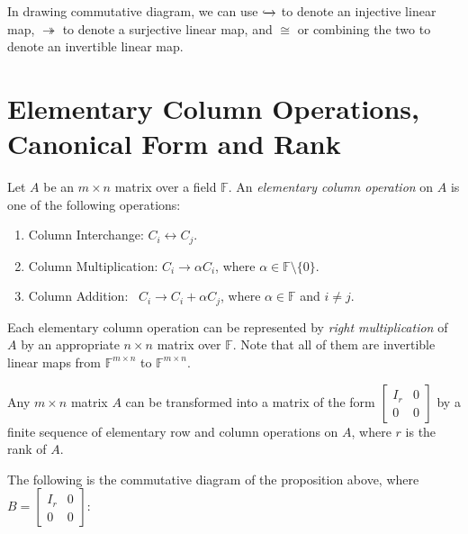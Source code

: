 \documentclass[
	11pt, %
	fleqn, %
	a4paper, %
]{LegrandOrangeBook}
\newcommand{\F}{\mathbb{F}} %
\begin{document}
\begin{remark}
    In drawing commutative diagram, we can use $\xhookrightarrow{}$ to denote an injective linear map, $\twoheadrightarrow$ to denote a surjective linear map, and $\cong$ or combining the two to denote an invertible linear map.
\end{remark}

\newpage

\section{Elementary Column Operations, Canonical Form and Rank}

\begin{definition}
    Let $A$ be an $m \times n$ matrix over a field $\F$. An \emph{elementary column operation} on $A$ is one of the following operations:
    \begin{enumerate}
        \item Column Interchange: \qquad $C_i \leftrightarrow C_j$.
        \item Column Multiplication: \quad $C_i \to \alpha C_i$, where $\alpha \in \F \setminus \{0\}$.
        \item Column Addition: \qquad\quad\ $C_i \to C_i + \alpha C_j$, where $\alpha \in \F$ and $i \neq j$.
    \end{enumerate}
    Each elementary column operation can be represented by \emph{right multiplication} of $A$ by an appropriate $n \times n$ matrix over $\F$. Note that all of them are invertible linear maps from $\F^{m \times n}$ to $\F^{m \times n}$.
\end{definition}

\begin{proposition}
    Any $m \times n$ matrix $A$ can be transformed into a matrix of the form $\begin{bmatrix}
        I_r & 0 \\
        0 & 0
    \end{bmatrix}$ by a finite sequence of elementary row and column operations on $A$, where $r$ is the rank of $A$.
\end{proposition}

The following is the commutative diagram of the proposition above, where $B = \begin{bmatrix}
    I_r & 0 \\
    0 & 0
\end{bmatrix}$:
\end{document}
